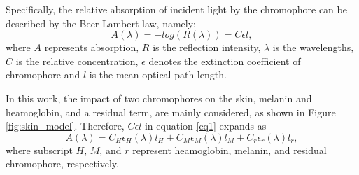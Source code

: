 \begin{spacing}{1.5}
Specifically, the relative absorption of incident light by the chromophore can be described by the Beer-Lambert law, namely:
\begin{equation}
    A(\lambda) = -log(R(\lambda)) = C\epsilon l,
    \label{eq1}
\end{equation}
where $A$ represents absorption, $R$ is the reflection intensity, $\lambda$ is the wavelengths, $C$ is the relative concentration, $\epsilon$ denotes the extinction coefficient of chromophore and $l$ is the mean optical path length.

In this work, the impact of two chromophores on the skin, melanin and heamoglobin, and a residual term, are mainly considered, as shown in Figure \ref{fig:skin_model}. Therefore, $C\epsilon l$ in equation \ref{eq1} expands as
\begin{equation}
    A(\lambda) = C_H\epsilon_H(\lambda)l_H + C_M\epsilon_M(\lambda)l_M + C_r\epsilon_r(\lambda)l_r,
    \label{eq2}
\end{equation}
where subscript $H$, $M$, and $r$ represent heamoglobin, melanin, and residual chromophore, respectively.


\end{spacing}
